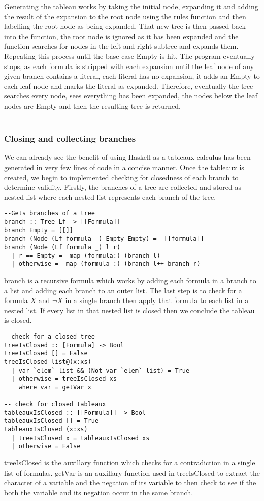 \documentclass{article}%
\begin{document}
Generating the tableau works by taking the initial node, expanding it and adding the result of the expansion to the root node using the rules function and then labelling the root node as being expanded. That new tree is then passed back into the function, the root node is ignored as it has been expanded and the function searches for nodes in the left and right subtree and expands them. Repeating this process until the base case Empty is hit. The program eventually stops, as each formula is stripped with each expansion until the leaf node of any given branch contains a literal, each literal has no expansion, it adds an Empty to each leaf node and marks the literal as expanded. Therefore, eventually the tree searches every node, sees everything has been expanded, the nodes below the leaf nodes are Empty and then the resulting tree is returned. \\\\
\subsubsection{Closing and collecting branches} 
We can already see the benefit of using Haskell as a tableaux calculus has been generated in very few lines of code in a concise manner. Once the tableaux is created, we begin to implemented checking for closedness of each branch to determine validity. Firstly, the branches of a tree are collected and stored as nested list where each nested list represents each branch of the tree. 
\begin{verbatim}
--Gets branches of a tree
branch :: Tree Lf -> [[Formula]]
branch Empty = [[]]
branch (Node (Lf formula _) Empty Empty) =  [[formula]]
branch (Node (Lf formula _) l r) 
  | r == Empty =  map (formula:) (branch l)
  | otherwise =  map (formula :) (branch l++ branch r)
\end{verbatim}
branch is a recursive formula which works by adding each formula in a branch to a list and adding each branch to an outer list. 
The last step is to check for a formula $X$ and $\neg{X}$ in a single branch then apply that formula to each list in a nested list. If every list in that nested list is closed then we conclude the tableau is closed.
\begin{verbatim}
--check for a closed tree 
treeIsClosed :: [Formula] -> Bool 
treeIsClosed [] = False 
treeIsClosed list@(x:xs)
  | var `elem` list && (Not var `elem` list) = True
  | otherwise = treeIsClosed xs
    where var = getVar x 

-- check for closed tableaux
tableauxIsClosed :: [[Formula]] -> Bool 
tableauxIsClosed [] = True 
tableauxIsClosed (x:xs) 
  | treeIsClosed x = tableauxIsClosed xs 
  | otherwise = False
\end{verbatim}
treeIsClosed is the auxillary function which checks for a contradiction in a single list of formulas. getVar is an auxillary function used in treeIsClosed to extract the character of a variable and the negation of its variable to then check to see if the both the variable and its negation occur in the same branch. 
\end{document}
